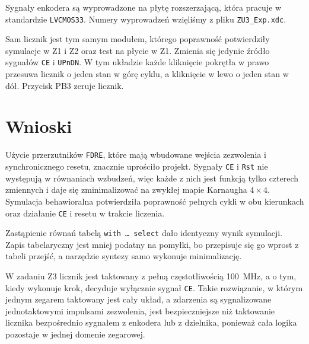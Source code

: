 \documentclass[11pt,a4paper]{article}
\begin{document}
Sygnały enkodera są wyprowadzone na płytę rozszerzającą, która pracuje w standardzie \texttt{LVCMOS33}. Numery wyprowadzeń wzięliśmy z pliku \texttt{ZU3\_Exp.xdc}.



Sam licznik jest tym samym modułem, którego poprawność potwierdziły symulacje w Z1 i Z2 oraz test na płycie w Z1. Zmienia się jedynie źródło sygnałów \texttt{CE} i \texttt{UPnDN}. W tym układzie każde kliknięcie pokrętła w prawo przesuwa licznik o jeden stan w górę cyklu, a kliknięcie w lewo o jeden stan w dół. Przycisk PB3 zeruje licznik.

\section{Wnioski}

Użycie przerzutników \texttt{FDRE}, które mają wbudowane wejścia zezwolenia i synchronicznego resetu, znacznie uprościło projekt. Sygnały \texttt{CE} i \texttt{Rst} nie występują w równaniach wzbudzeń, więc każde z nich jest funkcją tylko czterech zmiennych i daje się zminimalizować na zwykłej mapie Karnaugha $4 \times 4$. Symulacja behawioralna potwierdziła poprawność pełnych cykli w obu kierunkach oraz działanie \texttt{CE} i resetu w trakcie liczenia.

Zastąpienie równań tabelą \texttt{with \dots\ select} dało identyczny wynik symulacji. Zapis tabelaryczny jest mniej podatny na pomyłki, bo przepisuje się go wprost z tabeli przejść, a narzędzie syntezy samo wykonuje minimalizację.

W zadaniu Z3 licznik jest taktowany z pełną częstotliwością 100~MHz, a o tym, kiedy wykonuje krok, decyduje wyłącznie sygnał \texttt{CE}. Takie rozwiązanie, w którym jednym zegarem taktowany jest cały układ, a zdarzenia są sygnalizowane jednotaktowymi impulsami zezwolenia, jest bezpieczniejsze niż taktowanie licznika bezpośrednio sygnałem z enkodera lub z dzielnika, ponieważ cała logika pozostaje w jednej domenie zegarowej.
\end{document}
